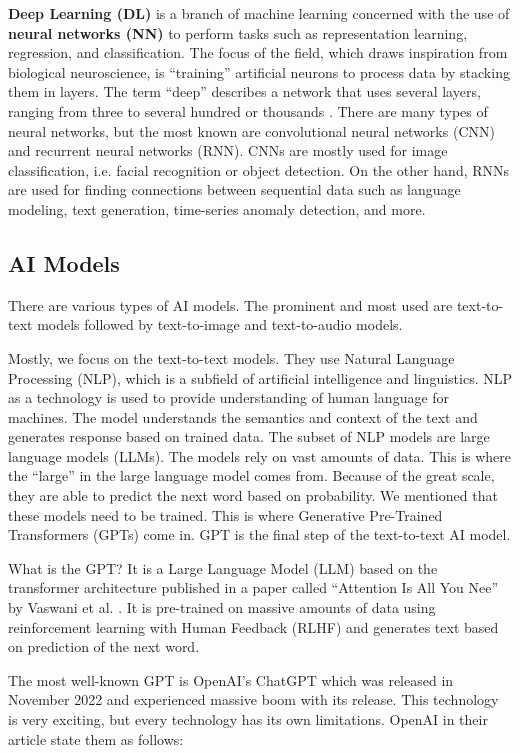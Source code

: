 \textbf{Deep Learning (DL)} is a branch of machine learning concerned with the use of \textbf{neural networks (NN)} to perform tasks such as representation learning, regression, and classification. The focus of the field, which draws inspiration from biological neuroscience, is ``training'' artificial neurons to process data by stacking them in layers. The term ``deep'' describes a network that uses several layers, ranging from three to several hundred or thousands \cite{LeCun2015}. There are many types of neural networks, but the most known are convolutional neural networks (CNN) and recurrent neural networks (RNN). CNNs are mostly used for image classification, i.e. facial recognition or object detection. On the other hand, RNNs are used for finding connections between sequential data such as language modeling, text generation, time-series anomaly detection, and more.


\subsection{AI Models \label{subsec:AI-Models}}

There are various types of AI models. The prominent and most used are text-to-text models followed by text-to-image and text-to-audio models. 

Mostly, we focus on the text-to-text models. They use Natural Language Processing (NLP), which is a subfield of artificial intelligence and linguistics. NLP as a technology is used to provide understanding of human language for machines. The model understands the semantics and context of the text and generates response based on trained data. The subset of NLP models are large language models (LLMs). The models rely on vast amounts of data. This is where the ``large'' in the large language model comes from. Because of the great scale, they are able to predict the next word based on probability. We mentioned that these models need to be trained. This is where Generative Pre-Trained Transformers (GPTs) come in. GPT is the final step of the text-to-text AI model. 

What is the GPT? It is a Large Language Model (LLM) based on the transformer architecture published in a paper called ``Attention Is All You Nee'' by Vaswani et al. \cite{vaswani2023attentionneed}. It is pre-trained on massive amounts of data using reinforcement learning with Human Feedback (RLHF) \cite{openai_chatgpt_page} and generates text based on prediction of the next word.

The most well-known GPT is OpenAI's ChatGPT which was released in November 2022 and experienced massive boom with its release. This technology is very exciting, but every technology has its own limitations. OpenAI in their article \cite{openai_chatgpt_page} state them as follows:

